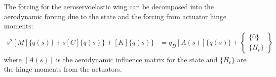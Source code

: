 The forcing for the aeroservoelastic wing can be decomposed into the aerodynamic forcing due to the state and the forcing from actuator hinge moments:
\begin{align}
    s^2 [M] \{q(s)\} + s [C] \{q(s)\} + [K] \{q(s)\} &= q_D [A(s)] \{q(s)\} + \begin{Bmatrix} \{0\} \\ \{H_c\} \end{Bmatrix}
\end{align}
where $[A(s)]$ is the aerodynamic influence matrix for the state and $\{H_c\}$ are the hinge moments from the actuators.

